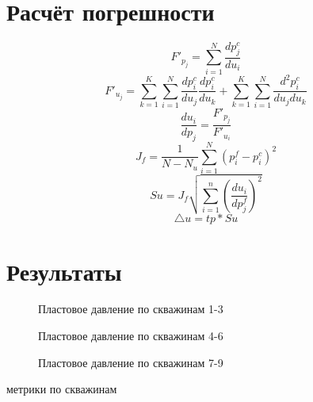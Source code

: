 \documentclass[14pt]{article}
\begin{document}
	\section{Расчёт погрешности}
	\begin{equation} \label{F_p}
		F'_{p_j} = \sum_{i=1}^N{\frac{dp^c_j}{du_i}}
	\end{equation}
	\begin{equation} \label{F_u}
		F'_{u_j} = \sum_{k=1}^K\sum_{i=1}^N{\frac{dp^c_i}{du_j}\frac{dp^c_i}{du_k}} + 
		\sum_{k=1}^K\sum_{i=1}^N{\frac{d^2p^c_i}{du_j du_k}}
	\end{equation}
	\begin{equation} \label{du_dp}
		\frac{du_i}{dp_j} = \frac{F'_{p_j}}{F'_{u_i}}
	\end{equation}
	\begin{equation} \label{Jf}
		J_f = \frac{1}{N-N_u}\sum_{i=1}^N{\left(p_i^f - p_i^c\right)^2}
	\end{equation}
	\begin{equation} \label{Sp}
		Su = J_f\sqrt{\sum_{i=1}^n{\left(\frac{du_i}{dp^f_j}\right)^2}}
	\end{equation}
	\begin{equation} \label{delta_u}
		\triangle{u} = tp*Su
	\end{equation}
	
	\section{Результаты}
\begin{figure}
	\caption{Пластовое давление по скважинам 1-3}
	\label{fig:map}
\end{figure}
\begin{figure}
	\caption{Пластовое давление по скважинам 4-6}
	\label{fig:map}
\end{figure}
\begin{figure}
	\caption{Пластовое давление по скважинам 7-9}
	\label{fig:map}
\end{figure}
метрики по скважинам
\end{document}
